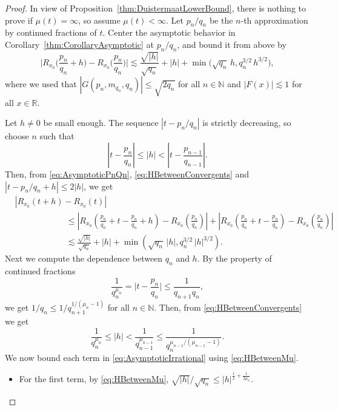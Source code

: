 \documentclass[11pt,reqno]{amsart}
\theoremstyle{definition}
\begin{document}
\begin{proof}
In view of Proposition~\ref{thm:DuistermaatLowerBound}, 
there is nothing to prove if $\mu(t) = \infty$, so assume $\mu(t) < \infty$. 
Let $p_n/q_n$ be the $n$-th approximation by continued fractions of $t$. 
Center the asymptotic behavior in Corollary~\ref{thm:CorollaryAsymptotic} at $p_n/q_n$, 
and bound it from above by 
\begin{equation}\label{eq:AsymptoticPnQn}
\Big| R_{x_0}\Big( \frac{p_n}{q_n} + h  \Big)  - R_{x_0}\Big( \frac{p_n}{q_n} \Big)   \Big| \lesssim 
 \frac{\sqrt{|h|}}{\sqrt{q_n}} + |h|  + \min \Big( \sqrt{q_n} \, h , q_n^{3/2}\, h^{3/2}  \Big),
\end{equation}
where we used that $|G(p_n, m_{q_n}, q_n)| \leq \sqrt{2q_n}$ for all $n \in \mathbb N$ and $|F(x)| \lesssim 1$ for all $x \in \mathbb R$. 

Let $h \neq 0$ be small enough. 
The sequence $| t -  p_n/q_n|$ is strictly decreasing,  
so choose $n$ 
such that 
\begin{equation}\label{eq:HBetweenConvergents}
\left| t - \frac{p_n}{q_n} \right| \leq |h| < \left| t - \frac{p_{n-1}}{q_{n-1}} \right|.
\end{equation} 
Then,
from \eqref{eq:AsymptoticPnQn}, \eqref{eq:HBetweenConvergents} and $|t - p_n/q_n + h| \leq 2|h|$, we get
\begin{equation}\label{eq:AsymptoticIrrational}
\begin{split}
& \left| R_{x_0}\left( t + h  \right)  - R_{x_0}\left( t \right)   \right|  \\
& \qquad \qquad \qquad \leq \left| R_{x_0}\left(  \frac{p_n}{q_n} + t - \frac{p_n}{q_n} + h  \right)  - R_{x_0}\left( \frac{p_n}{q_n} \right)   \right|  + \left| R_{x_0}\left( \frac{p_n}{q_n} + t - \frac{p_n}{q_n}  \right)  - R_{x_0}\left( \frac{p_n}{q_n} \right)   \right| \\
& \qquad \qquad \qquad \lesssim  \frac{\sqrt{|h|}}{\sqrt{q_n}} + |h|  + \min \left( \sqrt{q_n} \, |h| , q_n^{3/2}\, |h|^{3/2}  \right).
\end{split}
\end{equation}
Next we compute the dependence between $q_n$ and $h$. 
By the property of continued fractions
\begin{equation}
\frac{1}{q_n^{\mu_n}} = \Big| t - \frac{p_n}{q_n} \Big| \leq \frac{1}{q_{n+1}q_n}, 
\end{equation}
we get $1/q_n \leq 1/q_{n+1}^{1/(\mu_n - 1)}$ for all $n  \in \mathbb N$. 
Then, from \eqref{eq:HBetweenConvergents} we get
\begin{equation}\label{eq:HBetweenMu}
\frac{1}{q_n^{\mu_n}} \leq |h| < \frac{1}{q_{n-1}^{\mu_{n-1}}} \leq \frac{1}{q_n^{\mu_{n-1} / (\mu_{n-1} - 1 ) }}. 
\end{equation}
We now bound each term in \eqref{eq:AsymptoticIrrational} using \eqref{eq:HBetweenMu}.
\begin{itemize}
	\item For the first term, by \eqref{eq:HBetweenMu},
	$
	\sqrt{|h|}/\sqrt{q_n} \leq  |h|^{\frac12 + \frac{1}{2\mu_n}}.
	$
	

\end{itemize}
\end{proof}
\end{document}

